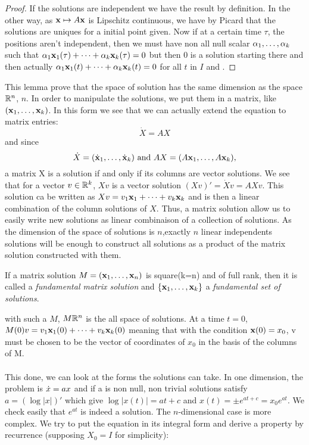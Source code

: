 \begin{proof}
If the solutions are independent we have the result by definition. In the other way, as $\mathbf{x}\mapsto A\mathbf{x}$ is Lipschitz continuous, we have by Picard that the solutions are uniques for a initial point given. Now if at a certain time $\tau$, the positions aren't independent, then we must have non all null scalar $\alpha_1,\dots,\alpha_k$ such that  $\alpha_1\mathbf{x}_1(\tau) + \dots + \alpha_k\mathbf{x}_k(\tau)=0$ but then 0 is a solution starting there and then actually  $\alpha_1\mathbf{x}_1(t) + \dots + \alpha_k\mathbf{x}_k(t)=0$ for all $t$ in $I$ and .
\end{proof}
This lemma prove that the space of solution has the same dimension as the space $\mathbb{R}^n$, \ie $n$.
In order to manipulate the solutions, we put them in a matrix, like $(\mathbf{x}_1,\dots,\mathbf{x}_k)$. In this form we see that we can actually extend the equation to matrix entries: 
\[\dot{X}=AX\]
and since 
\[\dot{X}=(\dot{\mathbf{x}}_1,\dots,\dot{\mathbf{x}}_k)  
\text{ and } 
AX=(A\mathbf{x}_1,\dots,A\mathbf{x}_k),\]
a matrix X is a solution if and only if its columns are vector solutions. We see that for a vector $v\in\mathbb{R}^k$, $Xv$ is a vector solution $(Xv)' = \dot{X}v = AXv$. This solution ca be written as $Xv = v_1\mathbf{x}_1 + \dots + v_k\mathbf{x}_k$ and is then a linear combination of the column solutions of $X$. Thus, a matrix solution allow us to easily write new solutions as linear combinaison of a collection of solutions. As the dimension of the space of solutions is $n$,exactly $n$ linear independents solutions will be enough to construct all solutions as a product of the matrix solution constructed with them.
\begin{definition}
    If a matrix solution $M=(\mathbf{x}_1,\dots,\mathbf{x}_n)$ is square(k=n) and of full rank, then it is called a \emph{fundamental matrix solution} and $\{\mathbf{x}_1,\dots,\mathbf{x}_k\}$ a \emph{fundamental set of solutions}.
\end{definition}
with such a $M$, $M\mathbb{R}^n$ is the all space of solutions. At a time $t=0$, $M(0)v=v_1\mathbf{x}_1(0) + \dots + v_k\mathbf{x}_k(0)$ meaning that with the condition $\mathbf{x}(0)=x_0$, v must be chosen to be the vector of coordinates of $x_0$ in the basis of the columns of M.
\\ \\
This done, we can look at the forms the solutions can take. In one dimension, the problem is $\dot{x}=ax$ and if a is non null, non trivial solutions satisfy $a=(\log|x|)'$ which give $\log|x(t)|=at+c$ and $x(t)=\pm e^{at+c}=x_0e^{at}$. We check easily that $e^{at}$ is indeed a solution. The $n$-dimensional case is more complex. We try to put the equation in its integral form and derive a property by recurrence (supposing $X_0=I$ for simplicity): 

